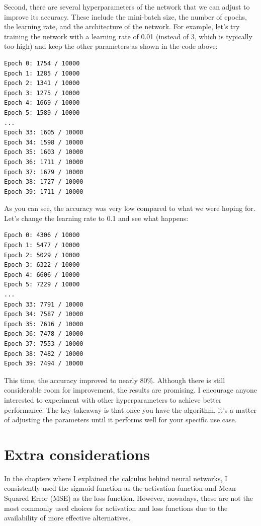\documentclass[../main]{subfiles}
\begin{document}
Second, there are several hyperparameters of the network that we can adjust to improve its accuracy. These include the mini-batch size, the number of epochs, the learning rate, and the architecture of the network. For example, let’s try training the network with a learning rate of 0.01 (instead of 3, which is typically too high) and keep the other parameters as shown in the code above:
\begin{lstlisting}
Epoch 0: 1754 / 10000
Epoch 1: 1285 / 10000
Epoch 2: 1341 / 10000
Epoch 3: 1275 / 10000
Epoch 4: 1669 / 10000
Epoch 5: 1589 / 10000
...
Epoch 33: 1605 / 10000
Epoch 34: 1598 / 10000
Epoch 35: 1603 / 10000
Epoch 36: 1711 / 10000
Epoch 37: 1679 / 10000
Epoch 38: 1727 / 10000
Epoch 39: 1711 / 10000
\end{lstlisting}
As you can see, the accuracy was very low compared to what we were hoping for. Let’s change the learning rate to 0.1 and see what happens:
\begin{lstlisting}
Epoch 0: 4306 / 10000
Epoch 1: 5477 / 10000
Epoch 2: 5029 / 10000
Epoch 3: 6322 / 10000
Epoch 4: 6606 / 10000
Epoch 5: 7229 / 10000
...
Epoch 33: 7791 / 10000
Epoch 34: 7587 / 10000
Epoch 35: 7616 / 10000
Epoch 36: 7478 / 10000
Epoch 37: 7553 / 10000
Epoch 38: 7482 / 10000
Epoch 39: 7494 / 10000
\end{lstlisting}
This time, the accuracy improved to nearly 80\%. Although there is still considerable room for improvement, the results are promising. I encourage anyone interested to experiment with other hyperparameters to achieve better performance. The key takeaway is that once you have the algorithm, it’s a matter of adjusting the parameters until it performs well for your specific use case.

\section{Extra considerations}
In the chapters where I explained the calculus behind neural networks, I consistently used the sigmoid function as the activation function and Mean Squared Error (MSE) as the loss function. However, nowadays, these are not the most commonly used choices for activation and loss functions due to the availability of more effective alternatives.
\end{document}
